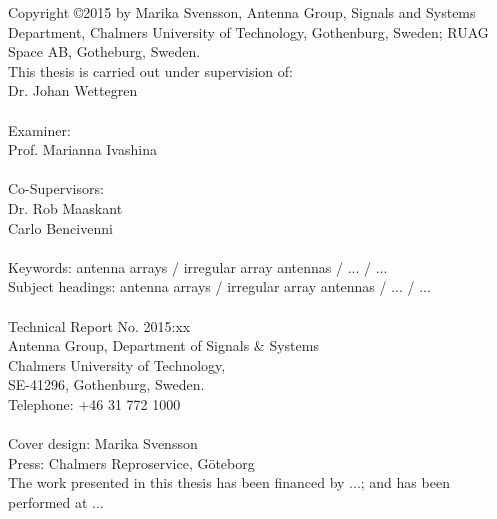 Copyright \copyright 2015 by Marika Svensson, Antenna Group, Signals and Systems Department, Chalmers University
of Technology, Gothenburg, Sweden; RUAG Space AB, Gotheburg, Sweden.\\[2ex]
This thesis is carried out under supervision of: \\
Dr. Johan Wettegren \\ \\
Examiner:\\
Prof. Marianna Ivashina\\ \\
Co-Supervisors: \\
Dr. Rob Maaskant \\
Carlo Bencivenni \\ \\%
Keywords: antenna arrays / irregular array antennas / ... / ... \\
Subject headings: antenna arrays / irregular array antennas / ... / ... \\
\mbox{$ $ \hspace{1cm}} \\[3ex]
Technical Report No. 2015:xx \\
Antenna Group, Department of Signals \& Systems \\
Chalmers University of Technology, \\
SE-41296, Gothenburg, Sweden. \\
Telephone: +46 31 772 1000 \\ \\
Cover design:  Marika Svensson\\
Press: Chalmers Reproservice, G\"oteborg \\[2ex]
The work presented in this thesis has been financed by ...; 
and has been performed at ...
